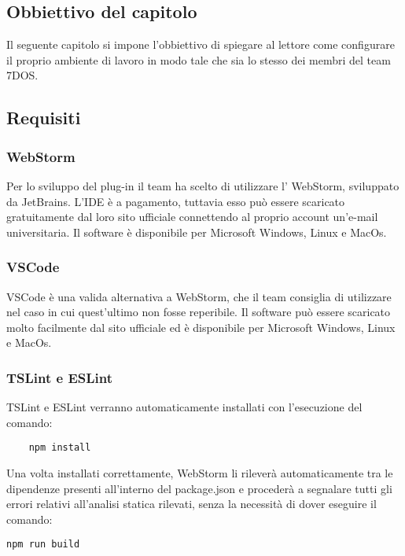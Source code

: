 \subsection{Obbiettivo del capitolo}
Il seguente capitolo si impone l'obbiettivo di spiegare al lettore come configurare il proprio ambiente di lavoro in modo tale che sia lo stesso dei membri del team 7DOS.  
\subsection{Requisiti}

\subsubsection{WebStorm}
Per lo sviluppo del plug-in il team ha scelto di utilizzare l' WebStorm, sviluppato da JetBrains. L'IDE è a pagamento, tuttavia esso può essere scaricato gratuitamente dal loro sito ufficiale connettendo al proprio account un'e-mail universitaria.
Il software è disponibile per Microsoft Windows, Linux e MacOs.
\subsubsection{VSCode}
VSCode è una valida alternativa a WebStorm, che il team consiglia di utilizzare nel caso in cui quest'ultimo non fosse reperibile.
Il software può essere scaricato molto facilmente dal sito ufficiale ed è disponibile per Microsoft Windows, Linux e MacOs.
\subsubsection{TSLint e ESLint}
TSLint e ESLint verranno automaticamente installati con l'esecuzione del comando:
\begin{verbatim}
	npm install
\end{verbatim}
Una volta installati correttamente, WebStorm li rileverà automaticamente tra le dipendenze presenti all'interno del package.json e procederà a segnalare tutti gli errori relativi all'analisi statica rilevati, senza la necessità di dover eseguire il comando:
\begin{verbatim}
npm run build
\end{verbatim}

\pagebreak